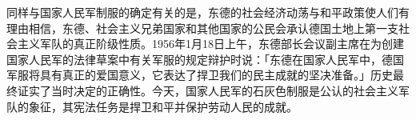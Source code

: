 同样与国家人民军制服的确定有关的是，东德的社会经济动荡与和平政策使人们有理由相信，东德、社会主义兄弟国家和其他国家的公民会承认德国土地上第一支社会主义军队的真正阶级性质。1956年1月18日上午，东德部长会议副主席在为创建国家人民军的法律草案中有关军服的规定辩护时说：「东德在国家人民军中，德国军服将具有真正的爱国意义，它表达了捍卫我们的民主成就的坚决准备。」历史最终证实了当时决定的正确性。今天，国家人民军的石灰色制服是公认的社会主义军队的象征，其宪法任务是捍卫和平并保护劳动人民的成就。
